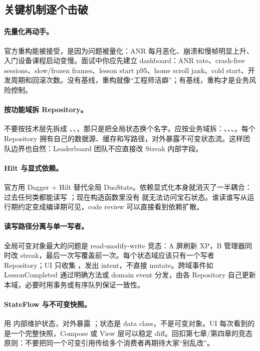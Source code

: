 \subsection{关键机制逐个击破}

\paragraph{先量化再动手。} \srcofficial 官方重构能被接受，是因为问题被量化：ANR 每月恶化、崩溃和慢帧明显上升、入门设备课程启动变慢。\srcinferred 面试中你应先建立 dashboard：ANR rate、crash-free sessions、slow/frozen frames、lesson start p95、home scroll jank、cold start、开发周期和回滚次数。没有基线，重构就像“工程师洁癖”；有基线，重构才是业务风险控制。

\paragraph{按功能域拆 Repository。} 不要按技术层先拆成 、、，那只是把全局状态换个名字。\srcinferred 应按业务域拆：、、、。每个 Repository 拥有自己的数据源、缓存和写路径，对外暴露不可变状态流。这样团队边界也自然：Leaderboard 团队不应直接改 Streak 内部字段。

\paragraph{Hilt 与显式依赖。} \srcofficial 官方用 Dagger + Hilt 替代全局 DuoState。\srcinferred 依赖显式化本身就消灭了一半耦合：过去任何类都能读写 ；现在构造函数里没有  就无法访问宝石状态。谁读谁写从运行期约定变成编译期可见，code review 可以直接看到依赖扩散。

\paragraph{读写路径分离与单一写者。} 全局可变对象最大的问题是 read-modify-write 竞态：A 屏刷新 XP，B 管理器同时改 streak，最后一次写覆盖前一次。\srcinferred 每个状态域应该只有一个写者 Repository；UI 只收集 ，发出 intent，不直接 mutate。跨域事件如 LessonCompleted 通过明确方法或 domain event 分发，由各 Repository 自己更新本域，必要时用事务或有序队列保证一致性。

\paragraph{StateFlow 与不可变快照。} 用  内部维护状态，对外暴露 ；状态是 data class，不是可变对象。\srcinferred UI 每次看到的是一个完整快照，Compose 或 View 层可以稳定 diff。回扣第七章/第四章的竞态原则：不要把同一个可变引用传给多个消费者再期待大家“别乱改”。

